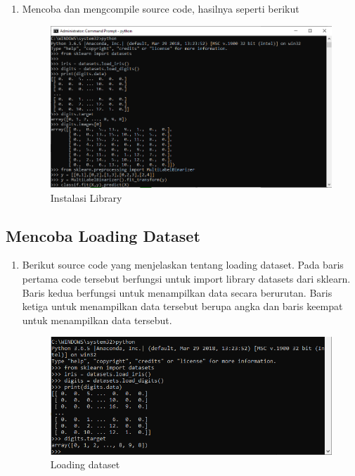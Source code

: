 \begin{enumerate}
\item Mencoba dan mengcompile source code, hasilnya seperti berikut
\begin{figure}[ht]
\centering
\includegraphics[scale=0.5]{figures/19.png}
\caption{Instalasi Library}
\end{figure}
\end{enumerate}

\subsection{Mencoba Loading Dataset}
\begin{enumerate}
\item Berikut source code yang menjelaskan tentang loading dataset. Pada baris pertama code tersebut berfungsi untuk import library datasets dari sklearn. Baris kedua berfungsi untuk menampilkan data secara berurutan. Baris ketiga untuk menampilkan data tersebut berupa angka dan baris keempat untuk menampilkan data tersebut.
\begin{figure}[ht]
\centering
\includegraphics[scale=0.5]{figures/20.png}
\caption{Loading dataset}
\end{figure}
\end{enumerate}

